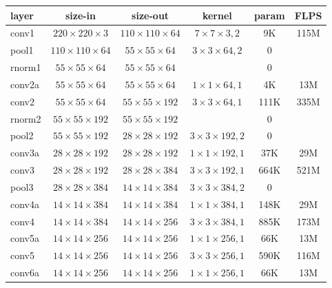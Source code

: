 \documentclass[10pt,twocolumn,letterpaper]{article}
\begin{document}
\begin{table}
\begin{center}
{\small
\renewcommand\tabcolsep{1.5pt}
\begin{tabular}[H]{|l|c|c|c|c|c|}
\hline
{\bf layer} & {\bf size-in} & {\bf size-out} & {\bf kernel} & {\bf param} & {\bf FLPS} \\
\hline\hline
conv1       & $220{\times}220{\times}3 $ & $110{\times}110{\times}64$ & $7{\times}7{\times}3,2$ & 9K &  115M \\
pool1       & $110{\times}110{\times}64$ & $55{\times}55{\times}64  $ & $3{\times}3{\times}64,2$ & 0 & \\
rnorm1      & $55{\times}55{\times}64  $ & $55{\times}55{\times}64  $ &            & 0 & \\
conv2a      & $55{\times}55{\times}64  $ & $55{\times}55{\times}64  $ & $1{\times}1{\times}64,1$ & 4K &  13M \\
conv2       & $55{\times}55{\times}64  $ & $55{\times}55{\times}192 $ & $3{\times}3{\times}64,1$ & 111K & 335M \\
rnorm2      & $55{\times}55{\times}192 $ & $55{\times}55{\times}192 $ &            & 0 & \\
pool2       & $55{\times}55{\times}192 $ & $28{\times}28{\times}192 $ & $3{\times}3{\times}192,2$ & 0 & \\
conv3a      & $28{\times}28{\times}192 $ & $28{\times}28{\times}192 $ & $1{\times}1{\times}192,1$ & 37K & 29M \\
conv3       & $28{\times}28{\times}192 $ & $28{\times}28{\times}384 $ & $3{\times}3{\times}192,1$ & 664K & 521M \\
pool3       & $28{\times}28{\times}384 $ & $14{\times}14{\times}384 $ & $3{\times}3{\times}384,2$ & 0 & \\
conv4a      & $14{\times}14{\times}384 $ & $14{\times}14{\times}384 $ & $1{\times}1{\times}384,1$ & 148K & 29M \\
conv4       & $14{\times}14{\times}384 $ & $14{\times}14{\times}256 $ & $3{\times}3{\times}384,1$ & 885K & 173M \\
conv5a      & $14{\times}14{\times}256 $ & $14{\times}14{\times}256 $ & $1{\times}1{\times}256,1$ & 66K & 13M \\
conv5       & $14{\times}14{\times}256 $ & $14{\times}14{\times}256 $ & $3{\times}3{\times}256,1$ & 590K & 116M \\
conv6a      & $14{\times}14{\times}256 $ & $14{\times}14{\times}256 $ & $1{\times}1{\times}256,1$ & 66K & 13M \\

\end{tabular}}
\end{center}
\end{table}
\end{document}
